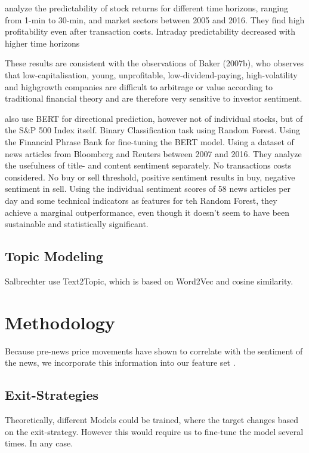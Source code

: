\documentclass[12pt,a4paper]{article}
\begin{document}
	
	\bigskip
	\textbf{\cite{liu_intraday_2023}} analyze the predictability of stock returns for different time horizons, ranging from 1-min to 30-min, and market sectors between 2005 and 2016.
	They find high profitability even after transaction costs.
	Intraday predictability decreased with higher time horizons
	
	
	\bigskip
	These results are consistent with the observations of Baker (2007b), who observes that low-capitalisation, young, unprofitable, low-dividend-paying, high-volatility and highgrowth companies are difficult to arbitrage or value according to traditional financial theory and are therefore very sensitive to investor sentiment.
	
	\bigskip
	\textbf{\cite{fazlija_using_2022}} also use BERT for directional prediction, however not of individual stocks, but of the S\&P 500 Index itself.
	Binary Classification task using Random Forest.
	Using the Financial Phrase Bank for fine-tuning the BERT model. %
	Using a dataset of news articles from Bloomberg and Reuters between 2007 and 2016. %
	They analyze the usefulness of title- and content sentiment separately.
	No transactions costs considered.
	No buy or sell threshold, positive sentiment results in buy, negative sentiment in sell.
	Using the individual sentiment scores of 58 news articles per day and some technical indicators as features for teh
	Random Forest, they achieve a marginal outperformance, even though it doesn't seem to have been sustainable and statistically significant.
	
	\subsection{Topic Modeling}
	Salbrechter use Text2Topic, which is based on Word2Vec and cosine similarity.
	
	
	
	
	\section{Methodology}
	Because pre-news price movements have shown to correlate with the sentiment of the news, we incorporate this information
	into our feature set \cite{ke_predicting_2020}.
	
	\subsection{Exit-Strategies}
	Theoretically, different Models could be trained, where the target changes based on the exit-strategy. 
	However this would require us to fine-tune the model several times.
	In any case.
	
\end{document}
